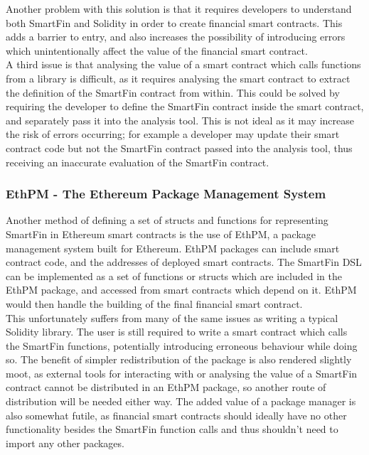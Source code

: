 Another problem with this solution is that it requires developers to understand both SmartFin and Solidity in order to create financial smart contracts. This adds a barrier to entry, and also increases the possibility of introducing errors which unintentionally affect the value of the financial smart contract. \\

A third issue is that analysing the value of a smart contract which calls functions from a library is difficult, as it requires analysing the smart contract to extract the definition of the SmartFin contract from within. This could be solved by requiring the developer to define the SmartFin contract inside the smart contract, and separately pass it into the analysis tool. This is not ideal as it may increase the risk of errors occurring; for example a developer may update their smart contract code but not the SmartFin contract passed into the analysis tool, thus receiving an inaccurate evaluation of the SmartFin contract.

\subsubsection{EthPM - The Ethereum Package Management System}

Another method of defining a set of structs and functions for representing SmartFin in Ethereum smart contracts is the use of EthPM, a package management system built for Ethereum. EthPM packages can include smart contract code, and the addresses of deployed smart contracts\cite{EthPM}. The SmartFin DSL can be implemented as a set of functions or structs which are included in the EthPM package, and accessed from smart contracts which depend on it. EthPM would then handle the building of the final financial smart contract. \\

This unfortunately suffers from many of the same issues as writing a typical Solidity library. The user is still required to write a smart contract which calls the SmartFin functions, potentially introducing erroneous behaviour while doing so. The benefit of simpler redistribution of the package is also rendered slightly moot, as external tools for interacting with or analysing the value of a SmartFin contract cannot be distributed in an EthPM package, so another route of distribution will be needed either way. The added value of a package manager is also somewhat futile, as financial smart contracts should ideally have no other functionality besides the SmartFin function calls and thus shouldn't need to import any other packages.



